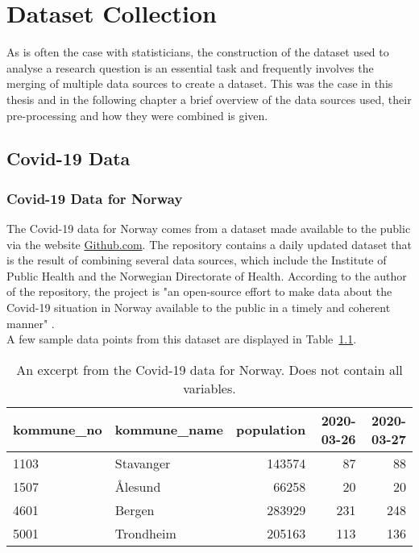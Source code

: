 %
\chapter{Dataset Collection}
As is often the case with statisticians, the construction of the dataset used to analyse a research question is an essential task and frequently involves the merging of multiple data sources to create a dataset. This was the case in this thesis and in the following chapter a brief overview of the data sources used, their pre-processing and how they were combined is given.
\label{sec:datacollection}
\clearpage
\section{Covid-19 Data}
\subsection*{Covid-19 Data for Norway}
The Covid-19 data for Norway comes from a dataset made available to the public via the website \href{https://www.github.com}{Github.com}. The repository contains a daily updated dataset that is the result of combining several data sources, which include the Institute of Public Health and the Norwegian Directorate of Health. According to the author of the repository, the project is "an open-source effort to make data about the Covid-19 situation in Norway available to the public in a timely and coherent manner" \cite{thohan88}. \\
A few sample data points from this dataset are displayed in Table~\ref{datasetNorge}.\\
\begin{table}[H] 
\caption{An excerpt from the Covid-19 data for Norway. Does not contain all variables.\label{datasetNorge}}
\begin{tabular}{l l r r r}
\toprule
\textbf{kommune\_no}	& \textbf{kommune\_name}	& \textbf{population}	& \textbf{2020-03-26}	& \textbf{2020-03-27}\\
\midrule
1103 & Stavanger & 143574 & 87 & 88 \\
1507 & Ålesund & 66258 & 20 & 20 \\
4601 & Bergen & 283929 & 231 & 248 \\
5001 & Trondheim & 205163 & 113 & 136 \\
\bottomrule
\end{tabular}
\end{table}

